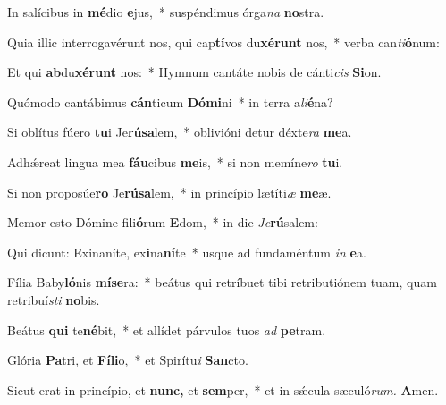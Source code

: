 \item In salícibus in \textbf{mé}dio \textbf{e}jus,~* suspéndimus órga\hspace{0.03em}\textit{na} \textbf{no}stra.
\item Quia illic interrogavérunt nos, qui cap\textbf{tí}vos du\textbf{xé}\textbf{runt} nos,~* verba can\textit{ti}\textbf{ó}num:
\item Et qui \textbf{ab}du\textbf{xé}\textbf{runt} nos:~* Hymnum cantáte nobis de cánti\hspace{0.03em}\textit{cis} \textbf{Si}on.
\item Quómodo cantábimus \textbf{cán}ticum \textbf{Dó}\textbf{mi}ni~* in terra a\hspace{0.04em}\textit{li}\textbf{é}na?
\item Si oblítus fúero \textbf{tu}i Je\textbf{rú}\textbf{sa}lem,~* oblivióni detur déxte\hspace{0.03em}\textit{ra} \textbf{me}a.
\item Adhǽreat lingua mea \textbf{fáu}cibus \textbf{me}is,~* si non memíne\hspace{0.03em}\textit{ro} \textbf{tu}i.
\item Si non proposúe\textbf{ro} Je\textbf{rú}\textbf{sa}lem,~* in princípio lætíti\hspace{0.03em}\textit{æ} \textbf{me}æ.
\item Memor esto Dómine fili\textbf{ó}rum \textbf{E}dom,~* in die \hspace{0.03em}\textit{Je}\textbf{rú}salem:
\item Qui dicunt: Exinaníte, ex\textbf{i}na\textbf{ní}te~* usque ad fundaméntum \textit{in} \textbf{e}a.
\item Fília Baby\textbf{ló}nis \textbf{mí}\textbf{se}ra:~* beátus qui retríbuet tibi retributiónem tuam, quam retribuí\hspace{0.04em}\textit{sti} \textbf{no}bis.
\item Beátus \textbf{qui} te\textbf{né}bit,~* et allídet párvulos tuos \textit{ad} \textbf{pe}tram.
\item Glória \textbf{Pa}tri, et \textbf{Fí}\textbf{li}o,~* et Spirítu\hspace{0.03em}\textit{i} \textbf{San}cto.
\item Sicut erat in princípio, et \textbf{nunc,} et \textbf{sem}per,~* et in sǽcula sæculó\textit{rum.} \textbf{A}men.